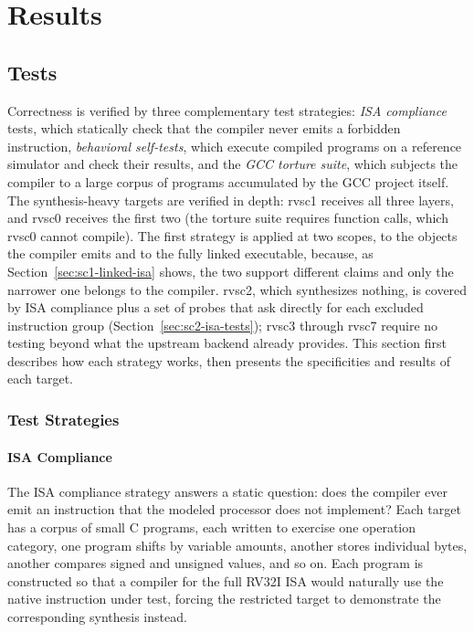 \chapter{Results} \label{cap:results}

\section{Tests}

Correctness is verified by three complementary test strategies: \textit{ISA compliance} tests, which
statically check that the compiler never emits a forbidden instruction, \textit{behavioral
self-tests}, which execute compiled programs on a reference simulator and check their results, and
the \textit{GCC torture suite}, which subjects the compiler to a large corpus of programs accumulated
by the GCC project itself. The synthesis-heavy targets are verified in depth: rvsc1 receives all
three layers, and rvsc0 receives the first two (the torture suite requires function calls, which
rvsc0 cannot compile). The first strategy is applied at two scopes, to the objects the compiler
emits and to the fully linked executable, because, as Section~\ref{sec:sc1-linked-isa} shows, the
two support different claims and only the narrower one belongs to the compiler. rvsc2, which
synthesizes nothing, is covered by ISA compliance plus a set of probes that ask directly for each
excluded instruction group (Section~\ref{sec:sc2-isa-tests}); rvsc3 through rvsc7 require no testing
beyond what the upstream backend already provides. This section first describes how each strategy
works, then presents the specificities and results of each target.

\subsection{Test Strategies}

\subsubsection{ISA Compliance} \label{sec:strategy-isa}

The ISA compliance strategy answers a static question: does the compiler ever emit an instruction that
the modeled processor does not implement? Each target has a corpus of small C programs, each written
to exercise one operation category, one program shifts by variable amounts, another stores individual
bytes, another compares signed and unsigned values, and so on. Each program is constructed so that a
compiler for the full RV32I ISA would naturally use the native instruction under test, forcing the
restricted target to demonstrate the corresponding synthesis instead.

